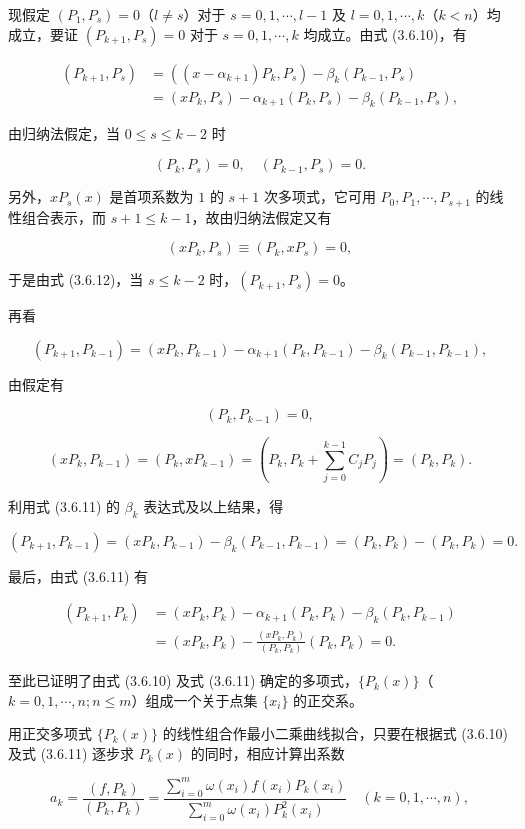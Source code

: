 \documentclass[
  10pt,
  fontset=fandol]{ctexart}
\begin{document}
现假定 \((P_1,P_s)=0\)（\(l\ne s\)）对于 \(s=0,1,\cdots,l-1\) 及 \(l=0,1,\cdots,k\)（\(k<n\)）均成立，要证 \((P_{k+1},P_s)=0\) 对于 \(s=0,1,\cdots,k\) 均成立。由式 (3.6.10)，有

\[
\begin{aligned}
(P_{k+1},P_s)&=((x-\alpha_{k+1})P_k,P_s)-\beta_k(P_{k-1},P_s)\\
&=(xP_k,P_s)-\alpha_{k+1}(P_k,P_s)-\beta_k(P_{k-1},P_s),
\end{aligned}\tag{3.6.12}
\]

由归纳法假定，当 \(0\leqslant s\leqslant k-2\) 时

\[
(P_k,P_s)=0,\quad(P_{k-1},P_s)=0.
\]

另外，\(xP_s(x)\) 是首项系数为 \(1\) 的 \(s+1\) 次多项式，它可用 \(P_0,P_1,\cdots,P_{s+1}\) 的线性组合表示，而 \(s+1\leqslant k-1\)，故由归纳法假定又有

\[
(xP_k,P_s)\equiv(P_k,xP_s)=0,
\]

于是由式 (3.6.12)，当 \(s\leqslant k-2\) 时，\((P_{k+1},P_s)=0\)。

再看

\[
(P_{k+1},P_{k-1})=(xP_k,P_{k-1})-\alpha_{k+1}(P_k,P_{k-1})-\beta_k(P_{k-1},P_{k-1}),\tag{3.6.13}
\]

由假定有

\[
(P_k,P_{k-1})=0,
\]

\[
(xP_k,P_{k-1})=(P_k,xP_{k-1})=\left(P_k,P_k+\sum_{j=0}^{k-1}C_jP_j\right)=(P_k,P_k).
\]

利用式 (3.6.11) 的 \(\beta_k\) 表达式及以上结果，得

\[
(P_{k+1},P_{k-1})=(xP_k,P_{k-1})-\beta_k(P_{k-1},P_{k-1})=(P_k,P_k)-(P_k,P_k)=0.
\]

最后，由式 (3.6.11) 有

\[
\begin{aligned}
(P_{k+1},P_k)&=(xP_k,P_k)-\alpha_{k+1}(P_k,P_k)-\beta_k(P_k,P_{k-1})\\
&=(xP_k,P_k)-\frac{(xP_k,P_k)}{(P_k,P_k)}(P_k,P_k)=0.
\end{aligned}
\]

至此已证明了由式 (3.6.10) 及式 (3.6.11) 确定的多项式，\(\{P_k(x)\}\)（\(k=0,1,\cdots,n;n\leqslant m\)）组成一个关于点集 \(\{x_i\}\) 的正交系。

用正交多项式 \(\{P_k(x)\}\) 的线性组合作最小二乘曲线拟合，只要在根据式 (3.6.10) 及式 (3.6.11) 逐步求 \(P_k(x)\) 的同时，相应计算出系数

\[
a_k=\frac{(f,P_k)}{(P_k,P_k)}=\frac{\displaystyle\sum_{i=0}^m\omega(x_i)f(x_i)P_k(x_i)}{\displaystyle\sum_{i=0}^m\omega(x_i)P_k^2(x_i)}\quad(k=0,1,\cdots,n),
\]
\end{document}
